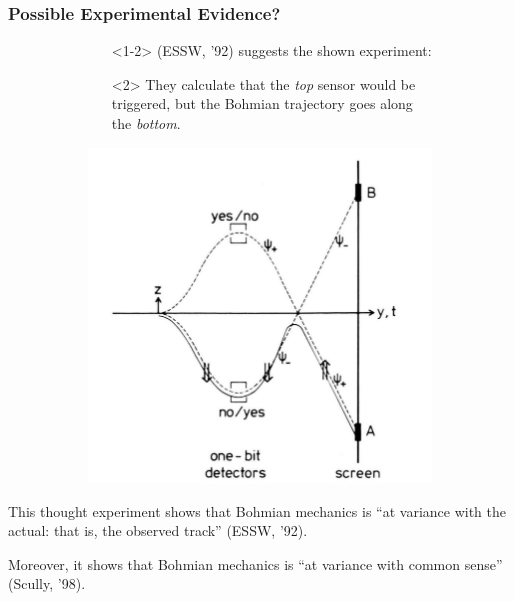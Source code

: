 \documentclass[compress,10pt,usenames,dvipsnames]{beamer}
\theoremstyle{remark}
\begin{document}
\begin{frame}\frametitle{Possible Experimental Evidence?}
	\begin{figure}
		\begin{subfigure}[t]{.6\textwidth}
			\vspace*{-1.5in}
			\begin{itemize}
				\item[]<1-2> (ESSW, '92) suggests the shown experiment:\bigskip
				\item[]<2> They calculate that the \emph{top} sensor would be triggered, but the Bohmian trajectory goes along the \emph{bottom}.
			\end{itemize}
		\end{subfigure}%
		\begin{subfigure}[t]{.4\textwidth}
			\centering
			\includegraphics[scale=0.45]{Figures/fake_fig1.png}
		\end{subfigure}
	\end{figure}
\end{frame}

\begin{frame}
	This thought experiment shows that Bohmian mechanics is ``at variance with the actual: that is, the observed track'' (ESSW, '92).
	
	\bigskip
	\pause
	Moreover, it shows that Bohmian mechanics is ``at variance with common sense'' (Scully, '98).
\end{frame}
\end{document}

